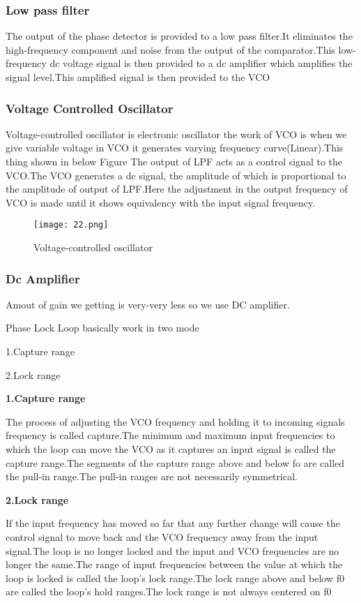 \documentclass{article}
\begin{document}
\subsubsection{Low pass filter}
The output of the phase detector is provided to a low pass filter.It eliminates the high-frequency component and noise from the output of the comparator.This low-frequency dc voltage signal is then provided to a dc  amplifier which amplifies the signal level.This amplified signal is then provided to the VCO

\subsubsection{Voltage Controlled Oscillator}
Voltage-controlled oscillator is electronic oscillator the work of VCO is when we give variable voltage in VCO it generates varying frequency curve(Linear).This thing shown in below Figure
The output of LPF acts as a control signal to the VCO.The VCO generates a dc signal, the amplitude of which is  proportional to the amplitude of output of LPF.Here the adjustment in the output frequency of VCO is made until it shows equivalency with the input signal frequency.

\begin{figure*}[h]
	\centering
	\texttt{[image: 22.png]}
	\caption{Voltage-controlled oscillator}
	\label{FBD}
\end{figure*}
\subsubsection{Dc Amplifier}
Amout of gain we getting is very-very less so we use DC amplifier.

Phase Lock Loop basically work in two mode \par
1.Capture range\par2.Lock range\par

\textbf{1.Capture range}\par
The process of adjusting the VCO frequency and holding it to incoming signals frequency is called capture.The minimum and maximum input frequencies to which the loop can move the VCO as it captures an input signal is called the capture range.The segments of the capture range above and below fo are called the pull-in range.The pull-in ranges are not necessarily symmetrical.\par
\par

\textbf{2.Lock range} \par
If the input frequency has moved so far that any further change will cause the control signal to move back and the VCO frequency away from the input signal.The loop is no longer locked and the input and VCO frequencies are no longer the same.The range of input frequencies between the value at which the loop is locked is called the loop’s lock range.The lock range above and below f0 are called the loop’s hold ranges.The lock range is not always centered on f0
\end{document}
